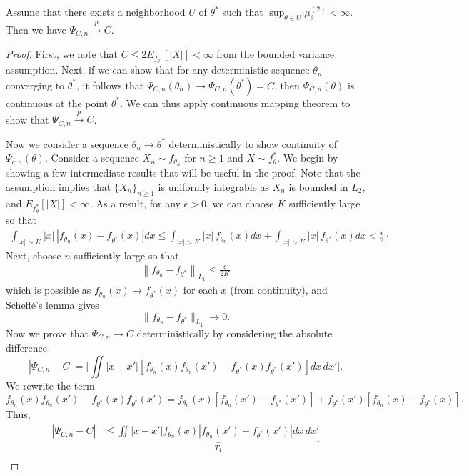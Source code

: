 \documentclass[10pt,a4paper]{amsart}
\begin{document}
\begin{lemma}
Assume that there exists a neighborhood $U$ of $\theta^*$ such that $\sup_{\theta \in U}\mu_\theta^{(2)} < \infty$. Then we have
$\Psi_{C,n}\overset{p}{\to} C.$ \label{lem:psi3}
\end{lemma}

\begin{proof}
First, we note that $C \leq 2E_{f_{\theta^*}}[|X|]<\infty$ from the bounded variance assumption. Next, if we can show that for any deterministic sequence $\theta_n$ converging to $\theta^*$, it follows that $\Psi_{C,n}(\theta_n)\to\Psi_{C,n}(\theta^*)=C$, then $\Psi_{C,n}(\theta)$ is continuous at the point $\theta^*$. We can thus apply continuous mapping theorem to show that $\Psi_{C,n}\overset{p}\to C$. 

Now we consider a sequence $\theta_n\to\theta^*$ deterministically to show continuity of $\Psi_{c,n}(\theta)$. Consider a sequence $X_n \sim f_{\theta_n}$ for $n \geq 1$ and $X \sim f_{\theta}^*$. 
We begin by showing a few intermediate results that will be useful in the proof. Note that the assumption implies that $\{X_n\}_{n \geq 1}$ is uniformly integrable as $X_n$ is bounded in $L_2$, and $E_{f_{\theta}^*}[|X|]<\infty$. As a result, for any $\epsilon > 0$, we can choose $K$ sufficiently large so that
\begin{align}
    \int_{|x|> K}|x|\,|f_{\theta_n}(x)-f_{\theta^*}(x)|dx\leq \int_{|x|> K}|x|\,f_{\theta_n}(x)dx+\int_{|x|> K}|x|\,f_{\theta^*}(x)dx <\frac{\epsilon}{2}\cdot \label{eq:ui1}
\end{align}
Next, choose $n$ sufficiently large so that
\begin{align}
    \left\|f_{\theta_n}-f_{\theta^*}\right\|_{L_1} \leq \frac{\epsilon}{2K} \label{eq:L1}
\end{align}
which is possible as $f_{\theta_n}(x) \to f_{\theta^*}(x)$ for each $x$ (from continuity), and Scheff\'{e}'s lemma gives
$$
\|f_{\theta_n}- f_{\theta^*}\|_{L_1} \to 0.
$$
Now we prove that $\Psi_{C,n}\to C$ deterministically by considering the absolute difference 
$$|\Psi_{C,n} -C|=\Big|\iint|x-x'|\left[f_{\theta_n}(x)f_{\theta_n}(x')-f_{\theta^*}(x)f_{\theta^*}(x')\right]dx\,dx'\Big|.$$
We rewrite the term 
$$f_{\theta_n}(x)f_{\theta_n}(x')-f_{\theta^*}(x)f_{\theta^*}(x')=f_{\theta_n}(x)\left[f_{\theta_n}(x')-f_{\theta^*}(x')\right]+f_{\theta^*}(x')\left[f_{\theta_n}(x)-f_{\theta^*}(x)\right].$$
Thus, 
\begin{align*}
|\Psi_{C,n}-C|&\leq \underbrace{\iint|x-x'|f_{\theta_n}(x)\left|f_{\theta_n}(x')-f_{\theta^*}(x')\right|dx\,dx'}_{T_1} \\

\end{align*}
\end{proof}
\end{document}
